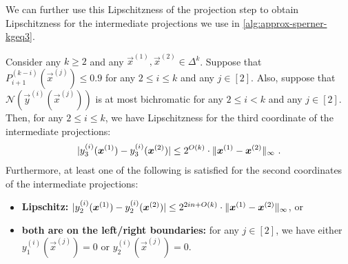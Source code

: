 We can further use this Lipschitzness of the projection step to obtain Lipschitzness for the intermediate projections we use in \cref{alg:approx-sperner-kgeq3}. 

\begin{lemma}
\label{lem:intermediate-projections-are-close-to-each-other}
    Consider any $k\geq 2$ and any $\vec{x}^{(1)}, \vec{x}^{(2)}\in \Delta^k$.
    Suppose that $P_{i+1}^{(k-i)}(\vec{x}^{(j)})\leq 0.9$ for any $2\leq i\leq k$ and any $j\in [2]$.
    Also, suppose that $\mathcal{N}(\vec{y}^{(i)}(\vec{x}^{(j)}))$ is at most bichromatic for any $2\leq i<k$ and any $j\in [2]$.
    Then, for any $2\leq i\leq k$, we have Lipschitzness for the third coordinate of the intermediate projections:
    \begin{align*}
        |{y^{(i)}_3(\boldsymbol{x}^{(1)})-y^{(i)}_3(\boldsymbol{x}^{(2)})} |\leq 2^{O(k)}\cdot \| {\boldsymbol{x}^{(1)}-\boldsymbol{x}^{(2)}} \|_{\infty}~.
    \end{align*}
    Furthermore, at least one of the following is satisfied for the second coordinates of the intermediate projections:
    \begin{itemize}[itemsep=0.1em, topsep=0.4em]
        \item {\bf Lipschitz:} $|{y_2^{(i)}(\boldsymbol{x}^{(1)})-y_2^{(i)}(\boldsymbol{x}^{(2)})} |\leq 2^{2in+O(k)}\cdot \| {\boldsymbol{x}^{(1)}-\boldsymbol{x}^{(2)}} \|_{\infty}$, or
        \item {\bf both are on the left/right boundaries:} for any $j\in [2]$, we have either $y_1^{(i)}(\vec{x}^{(j)})=0$ or $y_2^{(i)}(\vec{x}^{(j)})=0$. 
    \end{itemize}
\end{lemma}
